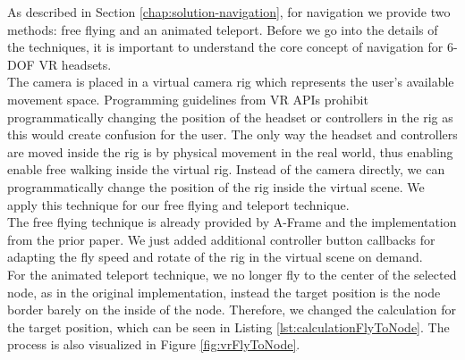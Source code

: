 As described in Section \ref{chap:solution-navigation}, for navigation we provide two methods: free flying and an animated teleport.
Before we go into the details of the techniques, it is important to understand the core concept of navigation for 6-DOF VR headsets.\\
The camera is placed in a virtual camera rig which represents the user's available movement space. %
Programming guidelines from VR APIs prohibit programmatically changing the position of the headset or controllers in the rig as this would create confusion for the user. 
The only way the headset and controllers are moved inside the rig is by physical movement in the real world, thus enabling enable free walking inside the virtual rig.
Instead of the camera directly, we can programmatically change the position of the rig inside the virtual scene. 
We apply this technique for our free flying and teleport technique.
\\
The free flying technique is already provided by A-Frame and the implementation from the prior paper.
We just added additional controller button callbacks for adapting the fly speed and rotate of the rig in the virtual scene on demand.\\
For the animated teleport technique, we no longer fly to the center of the selected node, as in the original implementation, instead the target position is the node border barely on the inside of the node. Therefore, we changed the calculation for the target position, which can be seen in Listing \ref{lst:calculationFlyToNode}. The process is also visualized in Figure \ref{fig:vrFlyToNode}.

